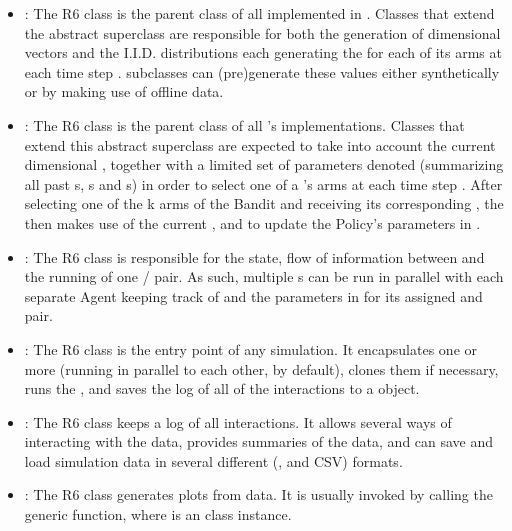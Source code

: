 \documentclass{jss}\usepackage[]{graphicx}\usepackage[]{color}
\begin{document}
\begin{itemize}
         \item {}: The R6 class  is the parent class of all  implemented in . Classes that extend the abstract superclass  are responsible for both the generation of  dimensional  vectors  and the  I.I.D. distributions each generating the  for each of its  arms at each time step .  subclasses can (pre)generate these values either synthetically or by making use of offline data.

         \item {}: The R6 class  is the parent class of all 's  implementations. Classes that extend this abstract  superclass are expected to take into account the current  dimensional , together with a limited set of parameters denoted  (summarizing all past s, s and s) in order to select one of a 's arms at each time step . After selecting one of the {k} arms of the Bandit and receiving its corresponding , the  then makes use of the current ,  and  to update the Policy's parameters in .

         \item {}: The R6 class  is responsible for the state, flow of information between and the running of one / pair. As such, multiple s can be run in parallel with each separate Agent keeping track of  and the parameters in  for its assigned  and  pair.

         \item {}: The R6 class  is the entry point of any  simulation. It encapsulates one or more  (running in parallel to each other, by default), clones them if necessary, runs the , and saves the log of all of the  interactions to a  object.

         \item {}: The R6 class  keeps a log of all  interactions. It allows several ways of interacting with the data, provides summaries of the data, and can save and load simulation data in several different (,  and CSV) formats.

         \item {}: The R6 class  generates plots from  data. It is usually invoked by calling the generic  function, where  is an  class instance.
\end{itemize}
\end{document}
